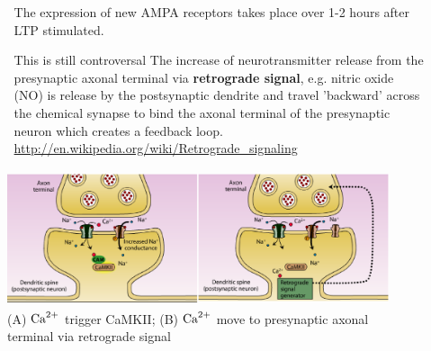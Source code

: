 \begin{itemize}
\begin{itemize}
The expression of new AMPA receptors takes place over 1-2 hours after LTP stimulated.

  \item  [This is still controversal] The increase of neurotransmitter release
  from the presynaptic axonal terminal via {\bf retrograde signal}, e.g. nitric oxide (NO) is release by the
  postsynaptic dendrite and travel 'backward' across the chemical
synapse to bind the axonal terminal of the presynaptic neuron which creates a
feedback loop.
\url{http://en.wikipedia.org/wiki/Retrograde_signaling}
\end{itemize}
\end{itemize}

\begin{figure}[htb]
\centerline{\includegraphics[height=4cm]{./images/Calcium-dendritic-spine.eps}}
\caption{(A) ${\text{Ca}^{2+}}$ trigger CaMKII; (B) ${\text{Ca}^{2+}}$
move to presynaptic axonal terminal via
retrograde signal}\label{fig:Calcium-dendritic-spine} 
\end{figure} 

